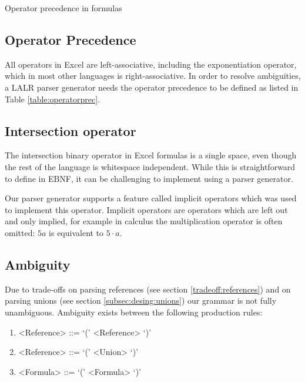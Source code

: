 \documentclass[conference]{IEEEtran}
\begin{document}
\begin{table}
	\centering
	\caption{Operator precedence in formulas}
	\label{table:operatorprec}
	
\end{table}

\subsection{Operator Precedence}
\label{sec:operatorprecedence}

All operators in Excel are left-associative, including the exponentiation operator, which in most other languages is right-associative.
In order to resolve ambiguities, a LALR parser generator needs the operator precedence to be defined as listed in Table \ref{table:operatorprec}.

\subsection{Intersection operator}

The intersection binary operator in Excel formulas is a single space, even though the rest of the language is whitespace independent. While this is straightforward to define in EBNF, it can be challenging to implement using a parser generator.

Our parser generator supports a feature called implicit operators which was used to implement this operator.
Implicit operators are operators which are left out and only implied, for example in calculus the multiplication operator is often omitted: $5a$ is equivalent to $5 \cdot a$.

\subsection{Ambiguity}
\label{sec:ambiguity}

Due to trade-offs on parsing references (see section \ref{tradeoff:references}) and on parsing unions (see section \ref{subsec:desing:unions}) our grammar is not fully unambiguous.
Ambiguity exists between the following production rules:
\begin{enumerate}
\item \begin{grammar}<Reference> ::= `(' <Reference> `)'\end{grammar}
\item \begin{grammar}<Reference> ::= `(' <Union> `)'\end{grammar}
\item \begin{grammar}<Formula> ::= `(' <Formula> `)'\end{grammar}
\end{enumerate}
\end{document}
